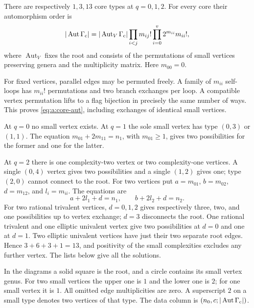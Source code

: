 \begin{lmm}\label{lmm:a:core-enumeration}
There are respectively $1,3,13$ core types at $q=0,1,2$. For every
core their automorphism order is
\begin{equation}\label{eq:a:core-aut}
 |\operatorname{Aut}\Gamma_{\rm c}|=
 |\operatorname{Aut}_V\Gamma_{\rm c}|
       \prod_{i<j}m_{ij}!\prod_{i=0}^v2^{m_{ii}}m_{ii}!,
\end{equation}
where $\operatorname{Aut}_V$ fixes the root and consists of the
permutations of small vertices preserving genera and the multiplicity
matrix. Here $m_{00}=0$.
\end{lmm}
\begin{prf}
For fixed vertices, parallel edges may be permuted freely. A family
of $m_{ii}$ self-loops has $m_{ii}!$ permutations and two branch
exchanges per loop. A compatible vertex permutation lifts to a flag
bijection in precisely the same number of ways. This proves
\eqref{eq:a:core-aut}, including exchanges of identical small vertices.

At $q=0$ no small vertex exists. At $q=1$ the sole small vertex has
type $(0,3)$ or $(1,1)$. The equation $m_{01}+2m_{11}=n_1$,
with $m_{01}\geq1$, gives two possibilities for the former and one
for the latter.

At $q=2$ there is one complexity-two vertex or two complexity-one
vertices. A single $(0,4)$ vertex gives two possibilities and a single
$(1,2)$ gives one; type $(2,0)$ cannot connect to the root. For two
vertices put $a=m_{01}$, $b=m_{02}$, $d=m_{12}$, and $l_i=m_{ii}$.
The equations are
\[
 a+2l_1+d=n_1,\qquad b+2l_2+d=n_2.
\]
For two rational trivalent vertices, $d=0,1,2$ gives respectively
three, two, and one possibilities up to vertex exchange; $d=3$
disconnects the root. One rational trivalent and one elliptic univalent
vertex give two possibilities at $d=0$ and one at $d=1$. Two elliptic
univalent vertices have just their two separate root edges. Hence
$3+6+3+1=13$, and positivity of the small complexities excludes any
further vertex. The lists below give all the solutions.
\end{prf}

In the diagrams a solid square is the root, and a circle contains its
small vertex genus. For two small vertices the upper one is $1$ and
the lower one is $2$; for one small vertex it is $1$. All omitted
edge multiplicities are zero. A superscript $2$ on a small type denotes
two vertices of that type. The data column is
$(n_0,c;|\operatorname{Aut}\Gamma_{\rm c}|)$.

